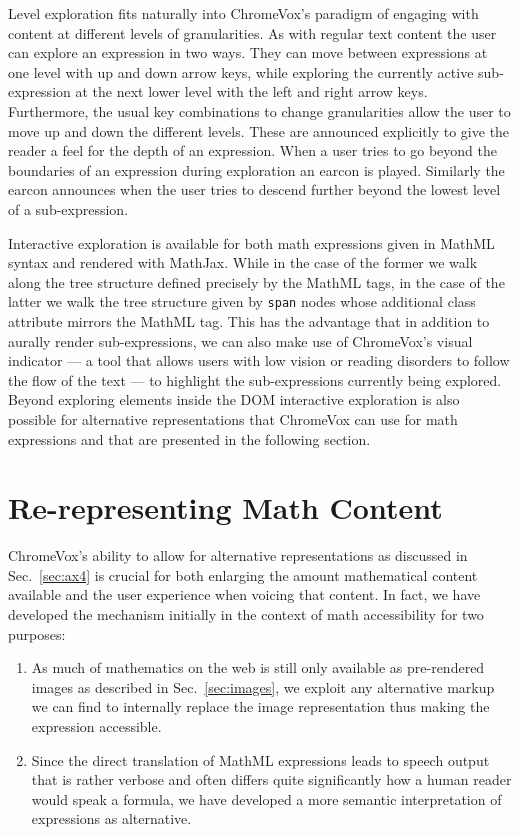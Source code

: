 \documentclass{sig-alternate}
\begin{document}
Level exploration fits naturally into ChromeVox's paradigm of engaging with
content at different levels of granularities. As with regular text content the
user can explore an expression in two ways. They can move between expressions at
one level with up and down arrow keys, while exploring the currently active
sub-expression at the next lower level with the left and right arrow
keys. Furthermore, the usual key combinations to change granularities allow the
user to move up and down the different levels. These are announced explicitly to
give the reader a feel for the depth of an expression.  When a user tries to go
beyond the boundaries of an expression during exploration an earcon is
played. Similarly the earcon announces when the user tries to descend further
beyond the lowest level of a sub-expression.

Interactive exploration is available for both math expressions given in MathML
syntax and rendered with MathJax. While in the case of the former we walk along
the tree structure defined precisely by the MathML tags, in the case of the
latter we walk the tree structure given by \texttt{span} nodes whose additional
class attribute mirrors the MathML tag. This has the advantage that in addition
to aurally render sub-expressions, we can also make use of ChromeVox's visual
indicator --- a tool that allows users with low vision or reading disorders to
follow the flow of the text --- to highlight the sub-expressions currently being
explored. Beyond exploring elements inside the DOM interactive exploration is
also possible for alternative representations that ChromeVox can use for math
expressions and that are presented in the following section.

\section{Re-representing Math Content}
\label{sec:alternative}

ChromeVox's ability to allow for alternative representations as discussed in
Sec.~\ref{sec:ax4} is crucial for both enlarging the amount mathematical content
available and the user experience when voicing that content. In fact, we have
developed the mechanism initially in the context of math accessibility for two
purposes:
\begin{enumerate}
\item As much of mathematics on the web is still only available as
  pre-rendered images as described in Sec.~\ref{sec:images}, we exploit any
  alternative markup we can find to internally replace the image representation
  thus making the expression accessible.
\item Since the direct translation of MathML expressions leads to speech output
  that is rather verbose and often differs quite significantly how a human
  reader would speak a formula, we have developed a more semantic interpretation
  of expressions as alternative.
\end{enumerate}
\end{document}

